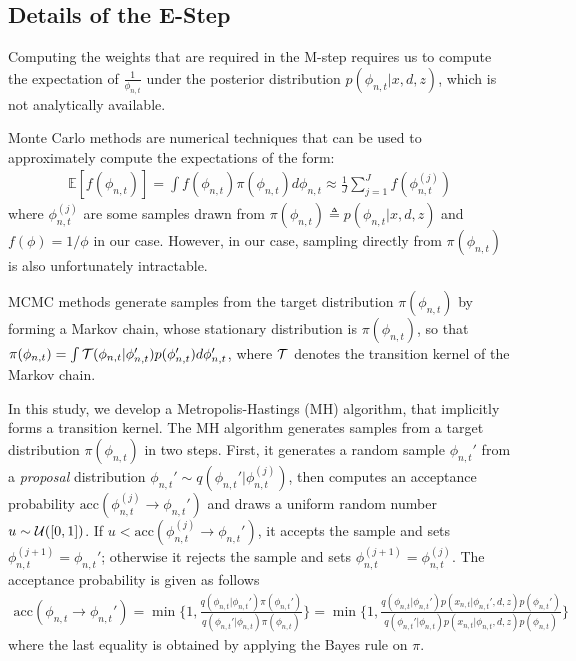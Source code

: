 \begin{appendices}
\chapter{}

\section{Details of the E-Step}


Computing the weights that are required in the M-step requires us to compute the expectation of $\frac1{\phi_{n,t}}$ under the posterior distribution $p(\phi_{n,t}|x,d,z)$, which is not analytically available. 

Monte Carlo methods are numerical techniques that can be used to approximately compute the expectations of the form:
\begin{align}
\mathds{E}[f(\phi_{n,t})] = \int f(\phi_{n,t}) \pi(\phi_{n,t}) d\phi_{n,t} \approx \frac1{J} \sum_{j=1}^J f(\phi_{n,t}^{(j)}) \label{eqn:mc}
\end{align}
where $\phi_{n,t}^{(j)}$ are some samples drawn from $\pi(\phi_{n,t}) \triangleq p(\phi_{n,t}|x,d,z)$ and $f(\phi) = 1/\phi$ in our case. However, in our case, sampling directly from $\pi(\phi_{n,t})$ is also unfortunately intractable.


MCMC methods generate samples from the target distribution $\pi(\phi_{n,t})$ by forming a Markov chain, whose stationary distribution is $\pi(\phi_{n,t})$, 
%
so that $\pi(\phi_{n,t}) = \int {\cal T}(\phi_{n,t}|\phi_{n,t}') p(\phi_{n,t}') d\phi_{n,t}'$, where ${\cal T}$ denotes the transition kernel of the Markov chain. 

In this study, we develop a Metropolis-Hastings (MH) algorithm, that implicitly forms a transition kernel. 
%
The MH algorithm generates samples from a target distribution $\pi(\phi_{n,t})$ in two steps. First, it generates a random sample $\phi_{n,t}'$ from a \emph{proposal} distribution $\phi_{n,t}' \sim q(\phi_{n,t}'|\phi_{n,t}^{(j)})$, then computes an acceptance probability $\text{acc}(\phi_{n,t}^{(j)} \rightarrow \phi_{n,t}')$ and draws a uniform random number $u \sim {\cal U}([0, 1])$. If $u < \text{acc}(\phi_{n,t}^{(j)} \rightarrow \phi_{n,t}')$, it accepts the sample and sets $\phi_{n,t}^{(j+1)} = \phi_{n,t}'$; otherwise it rejects the sample and sets $\phi_{n,t}^{(j+1)} = \phi_{n,t}^{(j)}$. The acceptance probability is given as follows
\begin{align}
\text{acc}(\phi_{n,t} \rightarrow \phi_{n,t}') = \min \Bigr\{1, \frac{q(\phi_{n,t}|\phi_{n,t}') \pi(\phi_{n,t}')}{q(\phi_{n,t}'|\phi_{n,t}) \pi(\phi_{n,t})}\Bigr\} = \min \Bigr\{1, \frac{q(\phi_{n,t}|\phi_{n,t}') p(x_{n,t}|\phi_{n,t}',d,z) p(\phi_{n,t}') }{q(\phi_{n,t}'|\phi_{n,t}) p(x_{n,t}|\phi_{n,t},d,z) p(\phi_{n,t}) }\Bigr\}
\end{align}
where the last equality is obtained by applying the Bayes rule on $\pi$. 


\end{appendices}
